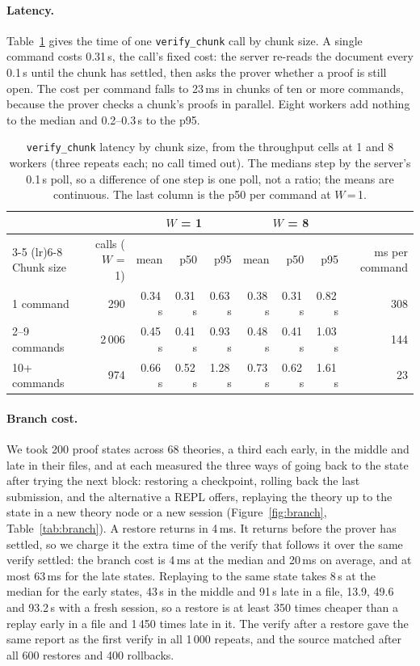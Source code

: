 \documentclass[11pt]{article}
\newcommand{\code}[1]{\colorbox{gray!12}{\texttt{\vphantom{Ag}#1}}}
\begin{document}
\paragraph{Latency.} Table~\ref{tab:latency} gives the time of one
\code{verify\_chunk} call by chunk size. A single command costs 0.31\,s,
the call's fixed cost: the server re-reads the document every 0.1\,s
until the chunk has settled, then asks the prover whether a proof is
still open. The cost per command falls to 23\,ms in chunks of ten or
more commands, because the prover checks a chunk's proofs in parallel.
Eight workers add nothing to the median and 0.2--0.3\,s to the p95.

\begin{table}[!htb]
\centering\small
\setlength{\tabcolsep}{4pt}
\begin{tabular}{@{}l r rrr rrr r@{}}
\toprule
 & & \multicolumn{3}{c}{$W$ = 1} & \multicolumn{3}{c}{$W$ = 8} & \\
\cmidrule(lr){3-5} \cmidrule(lr){6-8}
Chunk size & calls ($W$ = 1) & mean & p50 & p95 & mean & p50 & p95 & ms per command \\
\midrule
1 command   & 290   & 0.34\,s & 0.31\,s & 0.63\,s & 0.38\,s & 0.31\,s & 0.82\,s & 308 \\
2--9 commands & 2\,006 & 0.45\,s & 0.41\,s & 0.93\,s & 0.48\,s & 0.41\,s & 1.03\,s & 144 \\
10+ commands & 974   & 0.66\,s & 0.52\,s & 1.28\,s & 0.73\,s & 0.62\,s & 1.61\,s & 23 \\
\bottomrule
\end{tabular}
\caption{\code{verify\_chunk} latency by chunk size, from the throughput
  cells at 1 and 8 workers (three repeats each; no call timed out). The
  medians step by the server's 0.1\,s poll, so a difference of one step
  is one poll, not a ratio; the means are continuous. The last column is
  the p50 per command at $W$\,=\,1.}
\label{tab:latency}
\end{table}

\paragraph{Branch cost.} We took 200 proof states across 68 theories,
a third each early, in the middle and late in their files, and at each
measured the three ways of going back to the state after trying the next
block: restoring a checkpoint, rolling back the last submission, and the
alternative a REPL offers, replaying the theory up to the state in a new
theory node or a new session (Figure~\ref{fig:branch},
Table~\ref{tab:branch}). A restore returns in 4\,ms. It returns before
the prover has settled, so we charge it the extra time of the verify
that follows it over the same verify settled: the branch cost is 4\,ms at
the median and 20\,ms on average, and at most 63\,ms for the late states.
Replaying to the same state takes 8\,s at the median for the early
states, 43\,s in the middle and 91\,s late in a file, 13.9, 49.6 and
93.2\,s with a fresh session, so a restore is at least 350 times cheaper
than a replay early in a file and 1\,450 times late in it. The verify
after a restore gave the same report as the first verify in all 1\,000
repeats, and the source matched after all 600 restores and 400 rollbacks.
\end{document}
